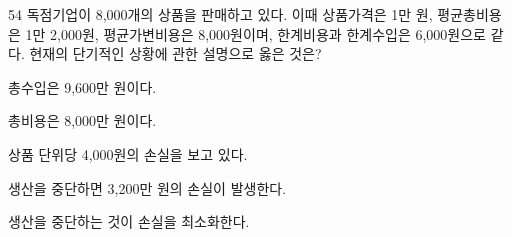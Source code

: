 \begin{question}{54}
독점기업이 8,000개의 상품을 판매하고 있다. 이때 상품가격은 1만 원, 평균총비용은 1만 2,000원, 평균가변비용은 8,000원이며, 한계비용과 한계수입은 6,000원으로 같다. 현재의 단기적인 상황에 관한 설명으로 옳은 것은?
\begin{choices}
  \item 총수입은 9,600만 원이다.
  \item 총비용은 8,000만 원이다.
  \item 상품 단위당 4,000원의 손실을 보고 있다.
  \item 생산을 중단하면 3,200만 원의 손실이 발생한다.
  \item 생산을 중단하는 것이 손실을 최소화한다.
\end{choices}
\end{question}
